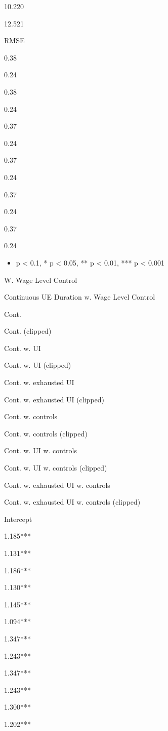 10.220

12.521

RMSE

0.38

0.24

0.38

0.24

0.37

0.24

0.37

0.24

0.37

0.24

0.37

0.24

\begin{itemize}
\tightlist
\item
  p \textless{} 0.1, * p \textless{} 0.05, ** p \textless{} 0.01, *** p
  \textless{} 0.001
\end{itemize}

W. Wage Level Control

\label{wcsdntwngj}
Continuous UE Duration w. Wage Level Control

Cont.

Cont. (clipped)

Cont. w. UI

Cont. w. UI (clipped)

Cont. w. exhausted UI

Cont. w. exhausted UI (clipped)

Cont. w. controls

Cont. w. controls (clipped)

Cont. w. UI w. controls

Cont. w. UI w. controls (clipped)

Cont. w. exhausted UI w. controls

Cont. w. exhausted UI w. controls (clipped)

Intercept

1.185***

1.131***

1.186***

1.130***

1.145***

1.094***

1.347***

1.243***

1.347***

1.243***

1.300***

1.202***

